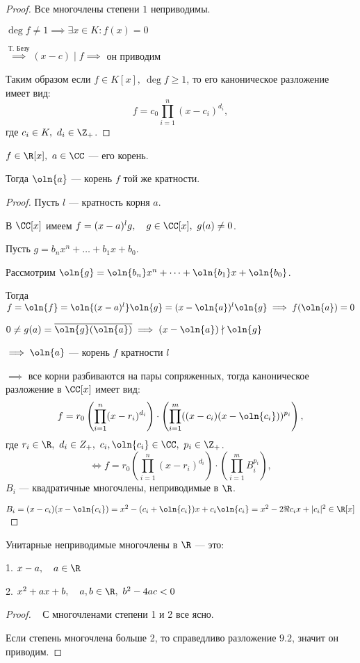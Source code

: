 \begin{proof}
    Все многочлены степени $1$ неприводимы.

    $\deg f \neq 1 \implies \exists x \in K: f(x) = 0$

    $\overset{\text{Т. Безу}}{\implies} (x - c) \mid f \implies$ он приводим

    Таким образом если $f \in K[x],~ \deg f \geq 1$, то его каноническое разложение имеет вид: \[f = c_0\prod\limits_{i = 1}^n (x - c_i)^{d_i},\] где $c_i \in K,~d_i \in \Z_+$.
\end{proof}

\begin{theorem-non}
    $f \in \R[x],~ a \in \CC$ --- его корень.

    Тогда $\oln{a}$ --- корень $f$ той же кратности.
\end{theorem-non}

\begin{proof}
    
    Пусть $l$ --- кратность корня $a$.

    В $\CC[x]$ имеем $f = (x - a)^lg,\quad g \in \CC[x],~ g(a) \neq 0$.

    Пусть $g = b_nx^n + \dots + b_1x + b_0$.

    Рассмотрим $\oln{g} = \oln{b_n}x^n + \dots + \oln{b_1}x + \oln{b_0}$.

    Тогда $f = \oln{f} = \oln{(x - a)^l}\oln{g} = (x - \oln{a})^l\oln{g} \implies f(\oln{a}) = 0$

    $0 \neq g(a) = \overline{\oln{g}(\oln{a})} \implies (x - \oln{a}) \nmid \oln{g}$

    $\implies \oln{a}$ --- корень $f$ кратности $l$

    $\implies$ все корни разбиваются на пары сопряженных, тогда каноническое разложение в $\CC[x]$ имеет вид:
    \[f = r_0\left(\prod\limits_{i = 1}^n (x - r_i)^{d_i}\right) \cdot \left(\prod\limits_{i = 1}^m ((x - c_i)(x - \oln{c_i}))^{p_i}\right),\]
    где $r_i \in \R,~d_i \in Z_+,~c_i,\oln{c_i} \in \CC,~p_i \in \Z_+$.
    \[\iff f = r_0\left(\prod\limits_{i = 1}^n (x - r_i)^{d_i}\right) \cdot \left(\prod\limits_{i = 1}^m B_i^{p_i}\right),\] 
    $B_i$ --- квадратичные многочлены, неприводимые в $\R$.

    $B_i = (x - c_i)(x - \oln{c_i}) = x^2 - (c_i + \oln{c_i})x + c_i \oln{c_i} = x^2 - 2 \Re c_i x + |c_i|^2 \in \R[x]$
\end{proof}

\begin{theorem-non}
    Унитарные неприводимые многочлены в $\R$ --- это:

    1. $x - a,\quad a \in \R$

    2. $x^2 + ax + b,\quad a, b \in \R,~ b^2 - 4ac < 0$
\end{theorem-non}

\begin{proof}~
    С многочленами степени 1 и 2 все ясно.

    Если степень многочлена больше 2, то справедливо разложение $9.2$, значит он приводим.
\end{proof}


